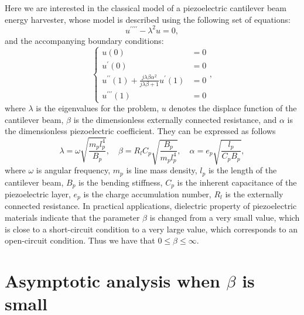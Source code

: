 \documentclass{article}
\begin{document}
Here we are interested in the classical model of a piezoelectric cantilever beam energy harvester, whose model is described using the following set of equations:
\begin{equation}
    u^{\prime\prime\prime\prime} - \lambda^2 u = 0,
\end{equation}
and the accompanying boundary conditions:
\begin{equation}
    \left\{\begin{aligned}
        u(0) &= 0 \\
        u^\prime(0) &= 0 \\
        u^{\prime\prime}(1) + \frac{j\lambda \beta \alpha^2}{ j\lambda \beta + 1 } u^\prime(1) &= 0 \\
        u^{\prime\prime\prime}(1) &= 0
    \end{aligned}\right.,
\end{equation}
where $\lambda$ is the eigenvalues for the problem, $u$ denotes the displace function of the cantilever beam, $\beta$ is the dimensionless externally connected resistance, and $\alpha$ is the dimensionless piezoelectric coefficient. They can be expressed as follows
\begin{equation}
    \lambda = \omega \sqrt{ \frac{ m_p l_p^4 }{ B_p } }, \quad \beta = R_l C_p \sqrt{\frac{B_p}{m_p l_p^4}}, \quad \alpha = e_p \sqrt{\frac{l_p}{C_p B_p}},
\end{equation}
where $\omega$ is angular frequency, $m_p$ is line mass density, $l_p$ is the length of the cantilever beam, $B_p$ is the bending stiffness, $C_p$ is the inherent capacitance of the piezoelectric layer, $e_p$ is the charge accumulation number, $R_l$ is the externally connected resistance. In practical applications, dielectric property of piezoelectric materials indicate that the parameter $\beta$ is changed from a very small value, which is close to a short-circuit condition to a very large value, which corresponds to an open-circuit condition. Thus we have that $0 \leq \beta \leq \infty$. 


\section{Asymptotic analysis when $\beta$ is small}
\end{document}

